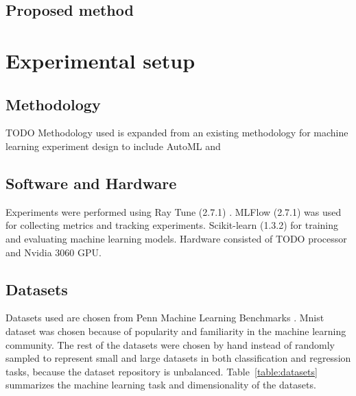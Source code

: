 \subsection{Proposed method}




\section{Experimental setup}

\subsection{Methodology}
TODO Methodology used is expanded from an existing methodology for machine learning experiment design \parencite{fernandez-lozanoMethodologyDesignExperiments2016} to include AutoML and

\subsection{Software and Hardware}

Experiments were performed using Ray Tune (2.7.1) \parencite{liawTuneResearchPlatform2018}. MLFlow (2.7.1) \parencite{chenDevelopmentsMLflowSystem2020} was used for collecting metrics and tracking experiments. Scikit-learn (1.3.2) \parencite{pedregosaScikitlearnMachineLearning2011} for training and evaluating machine learning models. Hardware consisted of TODO processor and Nvidia 3060 GPU.

\subsection{Datasets}

Datasets used are chosen from Penn Machine Learning Benchmarks \parencite{olsonPMLBLargeBenchmark2017}. Mnist dataset was chosen because of popularity and familiarity in the machine learning community. The rest of the datasets were chosen by hand instead of randomly sampled to represent small and large datasets in both classification and regression tasks, because the dataset repository is unbalanced. Table~\ref{table:datasets} summarizes the machine learning task and dimensionality of the datasets.

